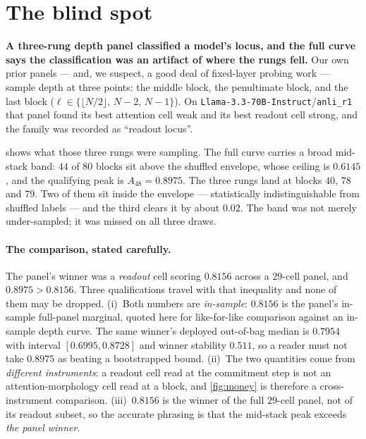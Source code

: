 \documentclass[10pt, letterpaper]{article}
\begin{document}
\section{The blind spot}
\label{sec:blindspot}

\textbf{A three-rung depth panel classified a model's locus, and the full curve
says the classification was an artifact of where the rungs fell.} Our own prior
panels --- and, we suspect, a good deal of fixed-layer probing work --- sample
depth at three points: the middle block, the penultimate block, and the last
block ($\ell \in \{\lfloor N/2 \rfloor,\, N-2,\, N-1\}$). On
\texttt{Llama-3.3-70B-Instruct}/\texttt{anli\_r1} that panel found its best
attention cell weak and its best readout cell strong, and the family was recorded
as ``readout locus''.

 shows what those three rungs were sampling. The full curve
carries a broad mid-stack band: $44$ of $80$ blocks sit above the shuffled
envelope, whose ceiling is $0.6145$, and the qualifying peak is $A_{48}=0.8975$.
The three rungs land at blocks $40$, $78$ and $79$. Two of them sit inside the
envelope --- statistically indistinguishable from shuffled labels --- and the
third clears it by about $0.02$. The band was not merely under-sampled; it
was missed on all three draws.

\paragraph{The comparison, stated carefully.} The panel's winner was a
\emph{readout} cell scoring $0.8156$ across a $29$-cell panel, and $0.8975 >
0.8156$. Three qualifications travel with that inequality and none of them may be
dropped. (i)~Both numbers are \emph{in-sample}: $0.8156$ is the panel's in-sample
full-panel marginal, quoted here for like-for-like comparison against an
in-sample depth curve. The same winner's deployed out-of-bag median is $0.7954$
with interval $[0.6995, 0.8728]$ and winner stability $0.511$, so a reader must
not take $0.8975$ as beating a bootstrapped bound. (ii)~The two quantities come
from \emph{different instruments}: a readout cell read at the commitment step is
not an attention-morphology cell read at a block, and \cref{fig:money} is
therefore a cross-instrument comparison. (iii)~$0.8156$ is the winner of the full
$29$-cell panel, not of its readout subset, so the accurate phrasing is that the
mid-stack peak exceeds \emph{the panel winner}.
\end{document}
